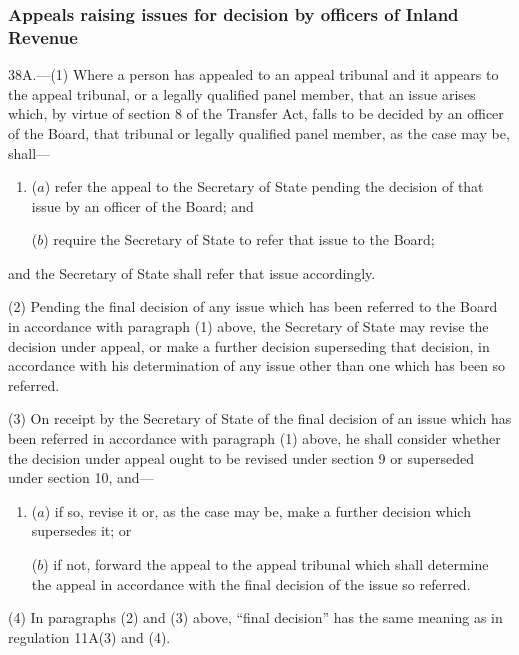 \documentclass[12pt,a4paper]{article}
\begin{document}
\subsubsection[38A. Appeals raising issues for decision by officers of Inland Revenue]{Appeals raising issues for decision by officers of Inland Revenue}

38A.---(1)  Where
a person has appealed to an appeal tribunal and it appears to the appeal tribunal, or a legally qualified panel member,  %
that an issue arises which, by virtue of section 8 of the Transfer Act, falls to be decided by an officer of the Board, that tribunal 
or legally qualified panel member, as the case may be,  %
shall—
\begin{enumerate}\item[]
($a$) refer the appeal to the Secretary of State pending the decision of that issue by an officer of the Board; and

($b$) require the Secretary of State to refer that issue to the Board;
\end{enumerate}
and the Secretary of State shall refer that issue accordingly.

(2) Pending the final decision of any issue which has been referred to the Board in accordance with paragraph (1) above, the Secretary of State may revise the decision under appeal, or make a further decision superseding that decision, in accordance with his determination of any issue other than one which has been so referred.

(3) On receipt by the Secretary of State of the final decision of an issue which has been referred in accordance with paragraph (1) above, he shall consider whether the decision under appeal ought to be revised under section 9 or superseded under section 10, and—
\begin{enumerate}\item[]
($a$) if so, revise it or, as the case may be, make a further decision which supersedes it; or

($b$) if not, forward the appeal to the appeal tribunal which shall determine the appeal in accordance with the final decision of the issue so referred.
\end{enumerate}

(4) In paragraphs (2) and (3) above, “final decision” has the same meaning as in regulation 11A(3) and (4).
\end{document}
